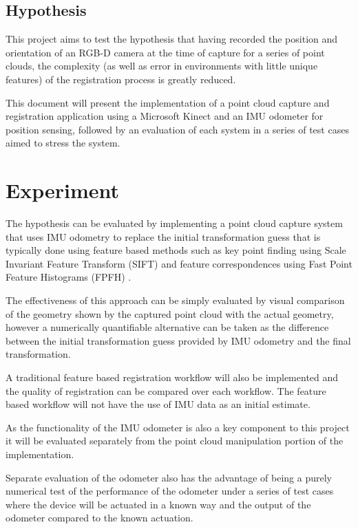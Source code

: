 \documentclass{entcs}
\begin{document}
\subsection{Hypothesis}

This project aims to test the hypothesis that having recorded the position and
orientation of an RGB-D camera at the time of capture for a series of point
clouds, the complexity (as well as error in environments with little unique
features) of the registration process is greatly reduced.

This document will present the implementation of a point cloud capture and
registration application using a Microsoft Kinect and an IMU odometer for
position sensing, followed by an evaluation of each system in a series of test
cases aimed to stress the system.

\section{Experiment}

The hypothesis can be evaluated by implementing a point cloud capture system
that uses IMU odometry to replace the initial transformation guess that is
typically done using feature based methods such as key point finding using Scale
Invariant Feature Transform (SIFT) \cite{Lowe1999} and feature correspondences
using Fast Point Feature Histograms (FPFH) \cite{Rusu2009}.

The effectiveness of this approach can be simply evaluated by visual comparison
of the geometry shown by the captured point cloud with the actual geometry,
however a numerically quantifiable alternative can be taken as the difference
between the initial transformation guess provided by IMU odometry and the final
transformation.

A traditional feature based registration workflow will also be implemented and
the quality of registration can be compared over each workflow. The feature
based workflow will not have the use of IMU data as an initial estimate.

As the functionality of the IMU odometer is also a key component to this project
it will be evaluated separately from the point cloud manipulation portion of the
implementation.

Separate evaluation of the odometer also has the advantage of being a purely
numerical test of the performance of the odometer under a series of test cases
where the device will be actuated in a known way and the output of the odometer
compared to the known actuation.
\end{document}
